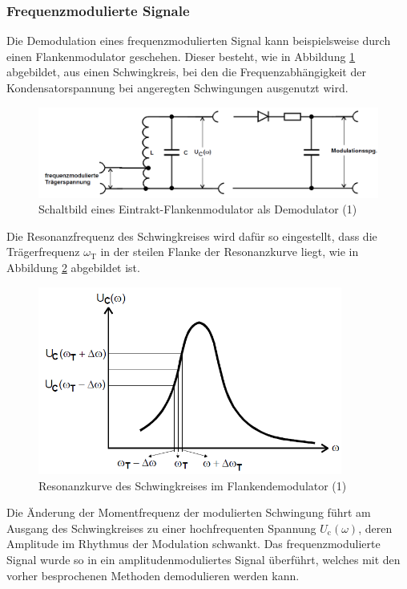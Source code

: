 \documentclass[]{scrartcl}
\begin{document}
\subsubsection*{Frequenzmodulierte Signale}
Die Demodulation eines frequenzmodulierten Signal kann beispielsweise durch einen Flankenmodulator geschehen. Dieser besteht, wie in Abbildung \ref{fig:Flankenmodulator} abgebildet, aus einen Schwingkreis, bei den die Frequenzabhängigkeit der Kondensatorspannung bei angeregten Schwingungen ausgenutzt wird.
\begin{figure}[H]
\centering 
\includegraphics[width=15cm]{images/Flankenmodulator.png}
\caption{Schaltbild eines Eintrakt-Flankenmodulator als Demodulator (1)}
\label{fig:Flankenmodulator}
\end{figure}
Die Resonanzfrequenz des Schwingkreises wird dafür so eingestellt, dass die Trägerfrequenz $\omega_{\text{T}}$ in der steilen Flanke der Resonanzkurve liegt, wie in Abbildung \ref{fig:flanke} abgebildet ist.
\begin{figure}[H]
\centering 
\includegraphics[width=10cm]{images/flanke.png}
\caption{Resonanzkurve des Schwingkreises im Flankendemodulator (1)}
\label{fig:flanke}
\end{figure}
Die Änderung der Momentfrequenz der modulierten Schwingung führt am Ausgang des Schwingkreises zu einer hochfrequenten Spannung $U_\text{c}\left(\omega\right)$, deren Amplitude im Rhythmus der Modulation schwankt. Das frequenzmodulierte Signal wurde so in ein amplitudenmoduliertes Signal überführt, welches mit den vorher besprochenen Methoden demodulieren werden kann.
\end{document}
